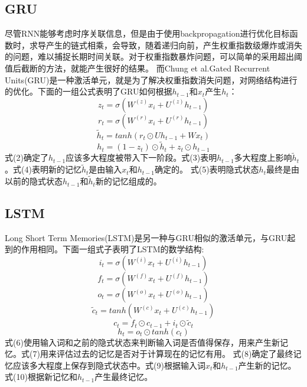 \subsection{GRU}
尽管RNN能够考虑时序关联信息，但是由于使用backpropagation进行优化目标函数时，求导产生的链式相乘，会导致，随着递归向前，产生权重指数级爆炸或消失的问题，难以捕捉长期时间关联。对于权重指数暴炸问题，可以简单的采用超出阈值后截断的方法，就能产生很好的结果。
而Chung et al.\cite{chung2015gated}Gated Recurrent Units(GRU)是一种激活单元，就是为了解决权重指数消失问题，对网络结构进行的优化。下面的一组公式表明了GRU如何根据$h_{t-1}$和$x_t$产生$h_{t}$：\\
\begin{equation}
z_t = \sigma (W^{(z)}x_i + U^{(z)}h_{t-1})
\end{equation}
\begin{equation}
r_t = \sigma (W^{(r)}x_i + U^{(r)}h_{t-1})
\end{equation}
\begin{equation}
\widetilde{h}_t = tanh(r_t \odot Uh_{t-1} + Wx_t)
\end{equation}
\begin{equation}
h_t = (1-z_t) \odot \widetilde{h}_t + z_t \odot h_{t-1}
\end{equation}
式(2)确定了$h_{t-1}$应该多大程度被带入下一阶段。式(3)表明$h_{t-1}$多大程度上影响$\widetilde{h}_t$。式(4)表明新的记忆$\widetilde{h}_t$是由输入$x_t$和$h_{t-1}$确定的。
式(5)表明隐式状态$h_t$最终是由以前的隐式状态$h_{t-1}$和$\widetilde{h}_t$新的记忆组成的。
\subsection{LSTM}
Long Short Term Memories(LSTM)\cite{hochreiter1997long}是另一种与GRU相似的激活单元，与GRU起到的作用相同。下面一组式子表明了LSTM的数学结构:\\
\begin{equation}
i_t = \sigma (W^{(i)}x_t + U^{(i)}h_{t-1})
\end{equation}
\begin{equation}
f_t = \sigma (W^{(f)}x_t + U^{(f)}h_{t-1})
\end{equation}
\begin{equation}
o_t = \sigma (W^{(o)}x_t + U^{(o)}h_{t-1})
\end{equation}
\begin{equation}
\widetilde{c}_t = tanh(W^{(c)}x_t + U^{(c)}h_{t-1})
\end{equation}
\begin{equation}
c_t = f_t \odot c_{t-1} + i_t \odot \widetilde{c}_t
\end{equation}
\begin{equation}
h_t = o_t \odot tanh(c_t)
\end{equation}
式(6)使用输入词和之前的隐式状态来判断输入词是否值得保存，用来产生新记忆。式(7)用来评估过去的记忆是否对于计算现在的记忆有用。
式(8)确定了最终记忆应该多大程度上保存到隐式状态中。式(9)根据输入词$x_t$和$h_{t-1}$产生新的记忆。式(10)根据新记忆和$h_{t-1}$产生最终记忆。
